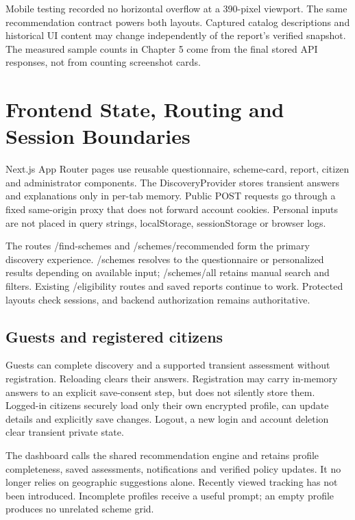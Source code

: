 \documentclass[12pt,a4paper,twoside]{report}
\begin{document}
{\small Mobile testing recorded no horizontal overflow at a 390-pixel viewport. The same recommendation contract powers both layouts. Captured catalog descriptions and historical UI content may change independently of the report's verified snapshot. The measured sample counts in Chapter 5 come from the final stored API responses, not from counting screenshot cards.}

\section{Frontend State, Routing and Session Boundaries}

Next.js App Router pages use reusable questionnaire, scheme-card, report, citizen and administrator components. The DiscoveryProvider stores transient answers and explanations only in per-tab memory. Public POST requests go through a fixed same-origin proxy that does not forward account cookies. Personal inputs are not placed in query strings, localStorage, sessionStorage or browser logs.

The routes /find-schemes and /schemes/recommended form the primary discovery experience. /schemes resolves to the questionnaire or personalized results depending on available input; /schemes/all retains manual search and filters. Existing /eligibility routes and saved reports continue to work. Protected layouts check sessions, and backend authorization remains authoritative.

\subsection*{Guests and registered citizens}

Guests can complete discovery and a supported transient assessment without registration. Reloading clears their answers. Registration may carry in-memory answers to an explicit save-consent step, but does not silently store them. Logged-in citizens securely load only their own encrypted profile, can update details and explicitly save changes. Logout, a new login and account deletion clear transient private state.

The dashboard calls the shared recommendation engine and retains profile completeness, saved assessments, notifications and verified policy updates. It no longer relies on geographic suggestions alone. Recently viewed tracking has not been introduced. Incomplete profiles receive a useful prompt; an empty profile produces no unrelated scheme grid.
\end{document}

